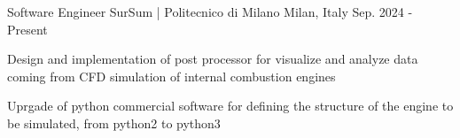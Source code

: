 

\begin{cventries}

  \cventry
    {Software Engineer} %
    {SurSum | Politecnico di Milano} %
    {Milan, Italy} %
    {Sep. 2024 - Present} %
    {
      \begin{cvitems} %
        \item {Design and implementation of post processor for visualize and analyze data coming from CFD simulation of internal combustion engines}
        \item {Uprgade of python commercial software for defining the structure of the engine to be simulated, from python2 to python3} 
      \end{cvitems}
    }


\end{cventries}
